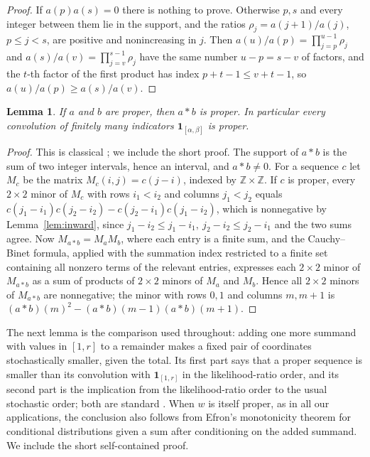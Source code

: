 \documentclass[11pt,a4paper]{amsart}
\newtheorem{lemma}[theorem]{Lemma}
\theoremstyle{definition}
\theoremstyle{remark}
\newcommand{\one}{\mathbf 1}
\begin{document}
\begin{proof}
If $a(p)a(s)=0$ there is nothing to prove. Otherwise $p,s$ and every integer between them lie in the support, and the ratios $\rho_j=a(j+1)/a(j)$, $p\le j<s$, are positive and nonincreasing in $j$. Then $a(u)/a(p)=\prod_{j=p}^{u-1}\rho_j$ and $a(s)/a(v)=\prod_{j=v}^{s-1}\rho_j$ have the same number $u-p=s-v$ of factors, and the $t$-th factor of the first product has index $p+t-1\le v+t-1$, so $a(u)/a(p)\ge a(s)/a(v)$.
\end{proof}

\begin{lemma}\label{lem:conv}
If $a$ and $b$ are proper, then $a*b$ is proper. In particular every convolution of finitely many indicators $\one_{[\alpha,\beta]}$ is proper.
\end{lemma}

\begin{proof}
This is classical \cite{Hoggar,Karlin,Stanley}; we include the short proof. The support of $a*b$ is the sum of two integer intervals, hence an interval, and $a*b\ne0$. For a sequence $c$ let $M_c$ be the matrix $M_c(i,j)=c(j-i)$, indexed by $\mathbb Z\times\mathbb Z$. If $c$ is proper, every $2\times2$ minor of $M_c$ with rows $i_1<i_2$ and columns $j_1<j_2$ equals $c(j_1-i_1)c(j_2-i_2)-c(j_2-i_1)c(j_1-i_2)$, which is nonnegative by Lemma~\ref{lem:inward}, since $j_1-i_2\le j_1-i_1,\ j_2-i_2\le j_2-i_1$ and the two sums agree. Now $M_{a*b}=M_aM_b$, where each entry is a finite sum, and the Cauchy--Binet formula, applied with the summation index restricted to a finite set containing all nonzero terms of the relevant entries, expresses each $2\times2$ minor of $M_{a*b}$ as a sum of products of $2\times2$ minors of $M_a$ and $M_b$. Hence all $2\times 2$ minors of $M_{a*b}$ are nonnegative; the minor with rows $0,1$ and columns $m,m+1$ is $(a*b)(m)^2-(a*b)(m-1)(a*b)(m+1)$.
\end{proof}

The next lemma is the comparison used throughout: adding one more summand with values in $[1,r]$ to a remainder makes a fixed pair of coordinates stochastically smaller, given the total. Its first part says that a proper sequence is smaller than its convolution with $\one_{[1,r]}$ in the likelihood-ratio order, and its second part is the implication from the likelihood-ratio order to the usual stochastic order; both are standard \cite{Karlin,SS}. When $w$ is itself proper, as in all our applications, the conclusion also follows from Efron's monotonicity theorem for conditional distributions given a sum \cite{Efron} after conditioning on the added summand. We include the short self-contained proof.
\end{document}
